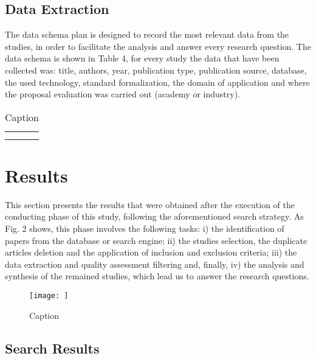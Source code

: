 \documentclass[peerreview]{IEEEtran}
\begin{document}
\subsection{Data Extraction}


The data schema plan is designed to record the most relevant data from the studies, in order to facilitate the analysis and answer every research question. The data schema is shown in Table 4, for every study the data that have been collected was: title, authors, year, publication type, publication source, database, the used technology, standard formalization, the domain of application and where the proposal evaluation was carried out (academy or industry).


\begin{table}[]
    \centering
    \begin{tabular}{c|c}
         &  \\
         & 
    \end{tabular}
    \caption{Caption}
    \label{tab:my_label}
\end{table}


\section{Results}


This section presents the results that were obtained after the execution of the conducting phase of this study, following the aforementioned search strategy. As Fig. 2 shows, this phase involves the following tasks: i) the identification of papers from the database or search engine; ii) the studies selection, the duplicate articles deletion and the application of inclusion and exclusion criteria; iii) the data extraction and quality assessment filtering and, finally, iv) the analysis and synthesis of the remained studies, which lead us to answer the research questions. 

\begin{figure}
    \centering
    \texttt{[image: ]}
    \caption{Caption}
    \label{fig:my_label}
\end{figure}



\subsection{Search Results}
\end{document}
